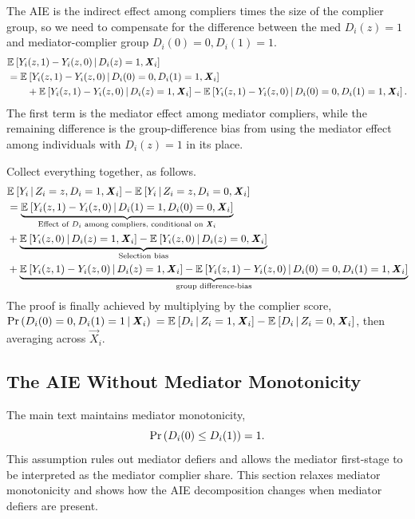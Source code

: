 The AIE is the indirect effect among compliers times the size of the complier group, so we need to compensate for the difference between the med $D_i(z) = 1$ and mediator-complier group $D_i(0)=0, D_i(1)=1$.
\begin{align*}
    &\mathbb{E}_{} \left[  Y_i(z,1)-Y_i(z,0)  \, \middle\vert \,  D_i(z)=1,\boldsymbol{\mathit{X}}_i  \right] \\
    &= \mathbb{E}_{} \left[  Y_i(z,1)-Y_i(z,0)  \, \middle\vert \,  D_i(0)=0,D_i(1)=1,\boldsymbol{\mathit{X}}_i  \right] \\
    &\qquad+ \mathbb{E}_{} \left[  Y_i(z,1)-Y_i(z,0)  \, \middle\vert \,  D_i(z)=1,\boldsymbol{\mathit{X}}_i  \right] - \mathbb{E}_{} \left[  Y_i(z,1)-Y_i(z,0)  \, \middle\vert \,  D_i(0)=0,D_i(1)=1,\boldsymbol{\mathit{X}}_i  \right]
    .
\end{align*}
The first term is the mediator effect among mediator compliers, while the remaining difference is the group-difference bias from using the mediator effect among individuals with $D_i(z)=1$ in its place.

Collect everything together, as follows.
\begin{align*}
    &\mathbb{E}_{} \left[ Y_i \, \middle\vert \, Z_i = z, D_i = 1, \boldsymbol{\mathit{X}}_i \right]
    - \mathbb{E}_{} \left[ Y_i \, \middle\vert \, Z_i = z, D_i = 0, \boldsymbol{\mathit{X}}_i \right] \\
    &= \underbrace{
        \mathbb{E}_{} \left[ Y_i(z, 1) - Y_i(z, 0) \, \middle\vert \, D_i(1) =1, D_i(0)=0,\boldsymbol{\mathit{X}}_i \right]}_{
            \text{Effect of $D_i$ among compliers, conditional on }\boldsymbol{\mathit{X}}_i} \\
    &+ \underbrace{
        \mathbb{E}_{} \left[ Y_i(z, 0) \, \middle\vert \, D_i(z) = 1, \boldsymbol{\mathit{X}}_i \right]
            - \mathbb{E}_{} \left[ Y_i(z, 0) \, \middle\vert \, D_i(z) = 0, \boldsymbol{\mathit{X}}_i \right]}_{
                \text{Selection bias}} \\
    &+ \underbrace{\mathbb{E}_{} \left[ Y_i(z, 1) - Y_i(z, 0) \, \middle\vert \, D_i(z)=1, \boldsymbol{\mathit{X}}_i \right]
            - \mathbb{E}_{} \left[ Y_i(z, 1) - Y_i(z, 0) \, \middle\vert \, D_i(0)=0, D_i(1)=1, \boldsymbol{\mathit{X}}_i \right] }_{
        \text{group difference-bias}}
\end{align*}
The proof is finally achieved by multiplying by the complier score, 
$\Pr\left( D_i(0)=0, D_i(1)=1 \, \middle\vert \, \boldsymbol{\mathit{X}}_i \right)$
$= \mathbb{E}_{} \left[ D_i \, \middle\vert \, Z_i = 1, \boldsymbol{\mathit{X}}_i \right] - \mathbb{E}_{} \left[ D_i \, \middle\vert \, Z_i = 0, \boldsymbol{\mathit{X}}_i \right]$,
then averaging across $\vec X_i$.

\subsection{The AIE Without Mediator Monotonicity}
\label{appendix:aie-with-defiers}
The main text maintains mediator monotonicity,
\[
    \Pr\left(  D_i(0) \leq D_i(1) \right) = 1.
\]
This assumption rules out mediator defiers and allows the mediator first-stage to be interpreted as the mediator complier share.
This section relaxes mediator monotonicity and shows how the AIE decomposition changes when mediator defiers are present.

